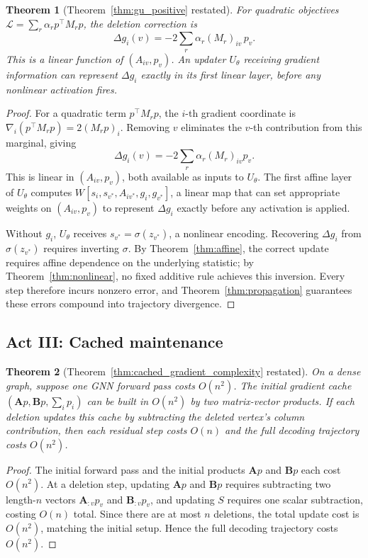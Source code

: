 \documentclass[11pt]{article}
\theoremstyle{plain}
\newtheorem{theorem}{Theorem}[section]
\theoremstyle{remark}
\begin{document}
\begin{theorem}[Theorem~\ref{thm:gu_positive} restated]
  For quadratic objectives $\mathcal{L}=\sum_r\alpha_r p^\top M_r p$, the deletion
  correction is
  \[
    \Delta g_i(v) = -2\sum_r\alpha_r(M_r)_{iv}\,p_v.
  \]
  This is a linear function of $(A_{iv}, p_v)$. An updater $U_\theta$ receiving
  gradient information can represent $\Delta g_i$ exactly in its first linear layer,
  before any nonlinear activation fires.
\end{theorem}
\begin{proof}
  For a quadratic term $p^\top M_r p$, the $i$-th gradient coordinate is
  $\nabla_i(p^\top M_r p) = 2(M_r p)_i$. Removing $v$ eliminates the $v$-th
  contribution from this marginal, giving
  \[
    \Delta g_i(v) = -2\sum_r \alpha_r (M_r)_{iv} p_v.
  \]
  This is linear in $(A_{iv}, p_v)$, both available as inputs to $U_\theta$. The
  first affine layer of $U_\theta$ computes $W[s_i, s_{v^*}, A_{iv^*}, g_i,
  g_{v^*}]$, a linear map that can set appropriate weights on $(A_{iv}, p_v)$ to
  represent $\Delta g_i$ exactly before any activation is applied.

  Without $g_i$, $U_\theta$ receives $s_{v^*} = \sigma(z_{v^*})$, a nonlinear
  encoding. Recovering $\Delta g_i$ from $\sigma(z_{v^*})$ requires inverting
  $\sigma$. By Theorem~\ref{thm:affine}, the correct update requires affine
  dependence on the underlying statistic; by Theorem~\ref{thm:nonlinear}, no fixed
  additive rule achieves this inversion. Every step therefore incurs nonzero error,
  and Theorem~\ref{thm:propagation} guarantees these errors compound into
  trajectory divergence.
\end{proof}

\subsection*{Act III: Cached maintenance}

\begin{theorem}[Theorem~\ref{thm:cached_gradient_complexity} restated]
  On a dense graph, suppose one GNN forward pass costs $O(n^2)$. The initial
  gradient cache $(\mathbf{A}p, \mathbf{B}p, \sum_i p_i)$ can be built in $O(n^2)$
  by two matrix-vector products. If each deletion updates this cache by subtracting
  the deleted vertex's column contribution, then each residual step costs $O(n)$
  and the full decoding trajectory costs $O(n^2)$.
\end{theorem}
\begin{proof}
  The initial forward pass and the initial products $\mathbf{A}p$ and $\mathbf{B}p$
  each cost $O(n^2)$. At a deletion step, updating $\mathbf{A}p$ and $\mathbf{B}p$
  requires subtracting two length-$n$ vectors $\mathbf{A}_{:v}p_v$ and
  $\mathbf{B}_{:v}p_v$, and updating $S$ requires one scalar subtraction, costing
  $O(n)$ total. Since there are at most $n$ deletions, the total update cost is
  $O(n^2)$, matching the initial setup. Hence the full decoding trajectory costs
  $O(n^2)$.
\end{proof}
\end{document}
